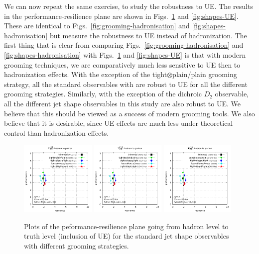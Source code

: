 \documentclass[11pt,letterpaper]{article}
\DeclareRobustCommand{\Figs}[2]{Figs.~\ref{#1} and \ref{#2}}
\begin{document}
We can now repeat the same exercise, to study the robustness to UE. The results in the performance-resilience plane are shown in \Figs{fig:grooming-UE}{fig:shapes-UE}. These are identical to \Figs{fig:grooming-hadronisation}{fig:shapes-hadronisation} but measure the robustness to UE instead of hadronization. The first thing that is clear from comparing \Figs{fig:grooming-hadronisation}{fig:shapes-hadronisation} with  \Figs{fig:grooming-UE}{fig:shapes-UE} is that with modern grooming techniques, we are comparatively much less sensitive to UE then to hadronization effects. With the exception of the tight$\otimes$plain/plain grooming strategy, all the standard observables with are robust to UE for all the different grooming strategies. Similarly, with the exception of the dichroic $D_2$ observable, all the different jet shape observables in this study are also robust to UE. We believe that this should be viewed as a success of modern grooming tools. We also believe that it is desirable, since UE effects are much less under theoretical control than hadronization effects. 

\begin{figure}
  \includegraphics[width=0.32\textwidth,page=26]{figures/grooming-scan-levels.pdf}
  \hfill
  \includegraphics[width=0.32\textwidth,page=14]{figures/grooming-scan-levels.pdf}
  \hfill
  \includegraphics[width=0.32\textwidth,page=32]{figures/grooming-scan-levels.pdf}
  \caption{Plots of the peformance-resilience plane going from hadron level to truth level (inclusion of UE) for the standard jet shape observables with different grooming strategies.}\label{fig:grooming-UE}
\end{figure}
\end{document}
